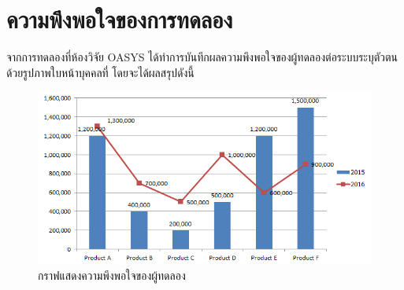 \section{ความพึงพอใจของการทดลอง}
จากการทดลองที่ห้องวิจัย OASYS ได้ทำการบันทึกผลความพึงพอใจของผู้ทดลองต่อระบบระบุตัวตนด้วยรูปภาพใบหน้าบุคคลที่ โดยจะได้ผลสรุปดังนี้

\begin{figure}[!ht]
    \begin{center}
      \includegraphics[scale=.5]{pic/bar_graph.png}
      \caption[กราฟแสดงความพึงพอใจของผู้ทดลอง]{กราฟแสดงความพึงพอใจของผู้ทดลอง}
      \label{fig:bar_graph}
    \end{center}
  \end{figure}